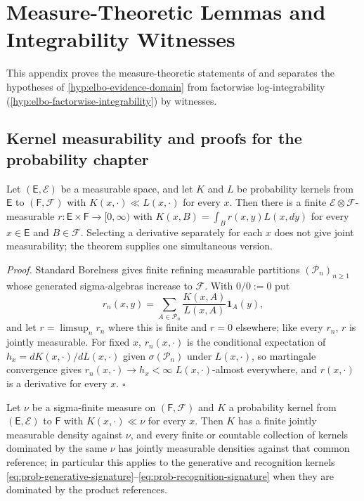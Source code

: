\chapter{Measure-Theoretic Lemmas and Integrability Witnesses}
\label{app:measure-lemmas}

This appendix proves the measure-theoretic statements of  and separates the
hypotheses of \cref{hyp:elbo-evidence-domain} from factorwise log-integrability
(\cref{hyp:elbo-factorwise-integrability}) by witnesses.

\section{Kernel measurability and proofs for the probability chapter}

Let $(\mathsf E,\mathscr E)$ be a measurable space, and let $K$ and $L$ be probability kernels from $\mathsf E$
to $(\mathsf F,\mathscr F)$ with $K(x,\cdot)\ll L(x,\cdot)$ for every $x$. Then there is a finite
$\mathscr E\otimes\mathscr F$-measurable $r:\mathsf E\times\mathsf F\to[0,\infty)$ with
$K(x,B)=\int_Br(x,y)L(x,dy)$ for every $x\in\mathsf E$ and $B\in\mathscr F$. Selecting a derivative separately
for each $x$ does not give joint measurability; the theorem supplies one simultaneous version.

\noindent\emph{Proof.}
Standard Borelness gives finite refining measurable partitions $(\mathcal P_n)_{n\geq1}$ whose generated
sigma-algebras increase to $\mathscr F$. With $0/0:=0$ put
\begin{equation}
r_n(x,y)=\sum_{A\in\mathcal P_n}\frac{K(x,A)}{L(x,A)}\mathbf 1_A(y),
\label{eq:prob-kernel-rn-partitions}
\end{equation}
and let $r=\limsup_nr_n$ where this is finite and $r=0$ elsewhere; like every $r_n$, $r$ is jointly
measurable. For fixed $x$, $r_n(x,\cdot)$ is the conditional expectation of $h_x=dK(x,\cdot)/dL(x,\cdot)$ given
$\sigma(\mathcal P_n)$ under $L(x,\cdot)$, so martingale convergence gives $r_n(x,\cdot)\to h_x<\infty$
$L(x,\cdot)$-almost everywhere, and $r(x,\cdot)$ is a derivative for every $x$. \hfill$\square$

Let $\nu$ be a sigma-finite measure on $(\mathsf F,\mathscr F)$ and $K$ a probability kernel from
$(\mathsf E,\mathscr E)$ to $\mathsf F$ with $K(x,\cdot)\ll\nu$ for every $x$. Then $K$ has a finite jointly
measurable density against $\nu$, and every finite or countable collection of kernels dominated by the same
$\nu$ has jointly measurable densities against that common reference; in particular this applies to the
generative and recognition kernels \eqref{eq:prob-generative-signature}--\eqref{eq:prob-recognition-signature}
when they are dominated by the product references. 

